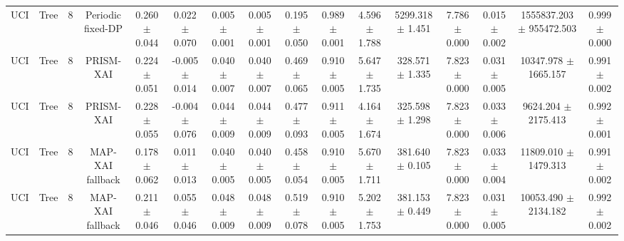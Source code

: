 \begin{tabular}{lccccccccccccccc}
UCI & Tree & 8 & Periodic fixed-DP & 0.260 $\pm$ 0.044 & 0.022 $\pm$ 0.070 & 0.005 $\pm$ 0.001 & 0.005 $\pm$ 0.001 & 0.195 $\pm$ 0.050 & 0.989 $\pm$ 0.001 & 4.596 $\pm$ 1.788 & 5299.318 $\pm$ 1.451 & 7.786 $\pm$ 0.000 & 0.015 $\pm$ 0.002 & 1555837.203 $\pm$ 955472.503 & 0.999 $\pm$ 0.000 \\
UCI & Tree & 8 & PRISM-XAI & 0.224 $\pm$ 0.051 & -0.005 $\pm$ 0.014 & 0.040 $\pm$ 0.007 & 0.040 $\pm$ 0.007 & 0.469 $\pm$ 0.065 & 0.910 $\pm$ 0.005 & 5.647 $\pm$ 1.735 & 328.571 $\pm$ 1.335 & 7.823 $\pm$ 0.000 & 0.031 $\pm$ 0.005 & 10347.978 $\pm$ 1665.157 & 0.991 $\pm$ 0.002 \\
UCI & Tree & 8 & PRISM-XAI & 0.228 $\pm$ 0.055 & -0.004 $\pm$ 0.076 & 0.044 $\pm$ 0.009 & 0.044 $\pm$ 0.009 & 0.477 $\pm$ 0.093 & 0.911 $\pm$ 0.005 & 4.164 $\pm$ 1.674 & 325.598 $\pm$ 1.298 & 7.823 $\pm$ 0.000 & 0.033 $\pm$ 0.006 & 9624.204 $\pm$ 2175.413 & 0.992 $\pm$ 0.001 \\
UCI & Tree & 8 & MAP-XAI fallback & 0.178 $\pm$ 0.062 & 0.011 $\pm$ 0.013 & 0.040 $\pm$ 0.005 & 0.040 $\pm$ 0.005 & 0.458 $\pm$ 0.054 & 0.910 $\pm$ 0.005 & 5.670 $\pm$ 1.711 & 381.640 $\pm$ 0.105 & 7.823 $\pm$ 0.000 & 0.033 $\pm$ 0.004 & 11809.010 $\pm$ 1479.313 & 0.991 $\pm$ 0.002 \\
UCI & Tree & 8 & MAP-XAI fallback & 0.211 $\pm$ 0.046 & 0.055 $\pm$ 0.046 & 0.048 $\pm$ 0.009 & 0.048 $\pm$ 0.009 & 0.519 $\pm$ 0.078 & 0.910 $\pm$ 0.005 & 5.202 $\pm$ 1.753 & 381.153 $\pm$ 0.449 & 7.823 $\pm$ 0.000 & 0.031 $\pm$ 0.005 & 10053.490 $\pm$ 2134.182 & 0.992 $\pm$ 0.002 \\
\bottomrule
\end{tabular}
